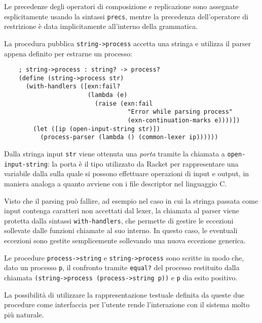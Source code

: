 Le precedenze degli operatori di composizione e replicazione sono
assegnate esplicitamente usando la sintassi \lstinline{precs}, mentre
la precedenza dell'operatore di restrizione \`e data implicitamente
all'interno della grammatica.

La procedura pubblica \lstinline{string->process} accetta una stringa
e utilizza il parser appena definito per estrarne un processo:

\begin{lstlisting}
    ; string->process : string? -> process?
    (define (string->process str)
      (with-handlers ([exn:fail?
                       (lambda (e)
                         (raise (exn:fail
                                  "Error while parsing process"
                                  (exn-continuation-marks e))))])
        (let ([ip (open-input-string str)])
          (process-parser (lambda () (common-lexer ip))))))
\end{lstlisting}

Dalla stringa input \lstinline{str} viene ottenuta una \emph{porta}
tramite la chiamata a \lstinline{open-input-string}: la porta \`e il
tipo utilizzato da Racket per rappresentare una variabile dalla sulla
quale si possono effettuare operazioni di input e output, in maniera
analoga a quanto avviene con i file descriptor nel linguaggio C.

Visto che il parsing pu\`o fallire, ad esempio nel caso in cui la
stringa passata come input contenga caratteri non accettati dal lexer,
la chiamata al parser viene protetta dalla sintassi
\lstinline{with-handlers}, che permette di gestire le eccezioni
sollevate dalle funzioni chiamate al suo interno. In questo caso,
le eventuali eccezioni sono gestite semplicemente sollevando una
nuova eccezione generica.

Le procedure \lstinline{process->string} e \lstinline{string->process}
sono scritte in modo che, dato un processo \lstinline{p}, il confronto
tramite \lstinline{equal?} del processo restituito dalla chiamata
\lstinline{(string->process (process->string p))} e \lstinline{p} dia
esito positivo.

La possibilit\`a di utilizzare la rappresentazione testuale definita
da queste due procedure come interfaccia per l'utente rende
l'interazione con il sistema molto pi\`u naturale.
